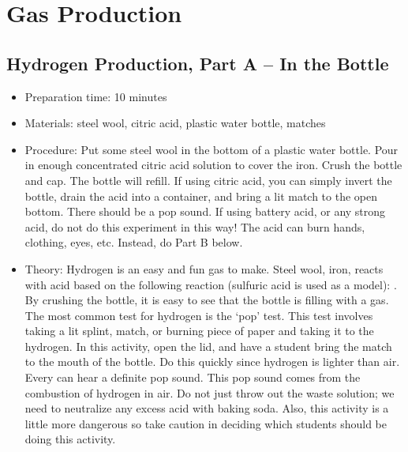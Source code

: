 \section{Gas Production}

\subsection{Hydrogen Production, Part A -- In the Bottle}
\begin{itemize}
\item{Preparation time: 10 minutes}
\item{Materials: steel wool, citric acid, plastic water bottle, matches}
\item{Procedure: Put some steel wool in the bottom of a plastic water bottle. Pour in enough concentrated citric acid solution to cover the iron. Crush the bottle and cap. The bottle will refill. If using citric acid, you can simply invert the bottle, drain the acid into a container, and bring a lit match to the open bottom. There should be a pop sound. If using battery acid, or any strong acid, do not do this experiment in this way! The acid can burn hands, clothing, eyes, etc. Instead, do Part B below.}
\item{Theory: Hydrogen is an easy and fun gas to make. Steel wool, iron, reacts with acid based on the following reaction (sulfuric acid is used as a model): . By crushing the bottle, it is easy to see that the bottle is filling with a gas. The most common test for hydrogen is the `pop' test. This test involves taking a lit splint, match, or burning piece of paper and taking it to the hydrogen. In this activity, open the lid, and have a student bring the match to the mouth of the bottle. Do this quickly since hydrogen is lighter than air. Every can hear a definite pop sound. This pop sound comes from the combustion of hydrogen in air. Do not just throw out the waste solution; we need to neutralize any excess acid with baking soda. Also, this activity is a little more dangerous so take caution in deciding which students should be doing this activity.}
\end{itemize}

